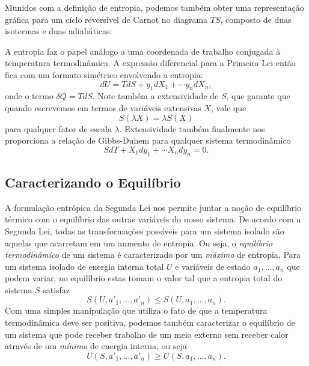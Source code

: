 Munidos com a definição de entropia, podemos também obter uma representação
gráfica para um cíclo reversível de Carnot no diagrama $TS$, composto de duas
isotermas e duas adiabáticas:
\begin{figure}[H]
    \centering
\end{figure}
A entropia faz o papel análogo a uma coordenada de trabalho conjugada à
temperatura termodinâmica. A expressão diferencial para a Primeira Lei então
fica com um formato simétrico envolvendo a entropia:
$$dU=TdS+y_1dX_1+\cdots y_ndX_n,$$
onde o termo $\delta Q=TdS$. Note também a extensividade de $S$, que garante que
quando escrevemos em termos de variáveis extensivas $X$, vale que
$$S(\lambda X)=\lambda S(X)$$
para qualquer fator de escala $\lambda$. Extensividade também finalmente nos
proporciona a relação de Gibbs-Duhem para qualquer sistema termodinâmico
$$SdT+X_1dy_1+\cdots X_ndy_n=0.$$

\subsection{Caracterizando o Equilíbrio}

A formulação entrópica da Segunda Lei nos permite juntar a noção de equilíbrio
térmico com o equilíbrio das outras variáveis do nosso sistema. De acordo com a
Segunda Lei, todas as transformações possíveis para um sistema isolado são
aquelas que acarretam em um aumento de entropia. Ou seja, o \emph{equilíbrio
termodinâmico} de um sistema é caracterizado por um \emph{máximo} de entropia.
Para um sistema isolado de energia interna total $U$ e variáveis de estado $a_1,
\dots,a_n$ que podem variar, no equilíbrio estas tomam o valor tal que a
entropia total do sistema $S$ satisfaz
$$S(U,a'_1,\dots,a'_n)\leq S(U,a_1,\dots,a_n).$$
Com uma simples manipulação que utiliza o fato de que a temperatura
termodinâmica deve ser positiva, podemos também caracterizar o equilíbrio de um
sistema que pode receber trabalho de um meio externo sem receber calor através
de um \emph{mínimo} de energia interna, ou seja
$$U(S,a'_1,\dots,a'_n)\geq U(S,a_1,\dots,a_n).$$


